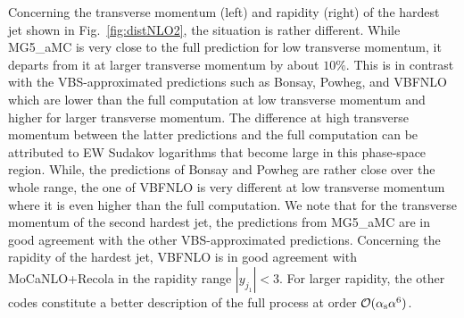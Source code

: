 \documentclass[twocolumn,epjc3]{svjour3} %
\begin{document}
    Concerning the transverse momentum (left) and rapidity (right) of the hardest jet shown in Fig.~\ref{fig:distNLO2}, the situation is rather different.
    While {\sc MG5\_aMC} is very close to the full prediction for low transverse momentum, it departs from it 
    at larger transverse momentum by about $10\%$.
    This is in contrast with the VBS-approximated predictions such as {\sc Bonsay}, {\sc Powheg}, and {\sc VBFNLO} which are lower than the full computation at low transverse momentum and higher for larger transverse momentum.
    The difference at high transverse momentum between the latter predictions and the full computation can be attributed to EW Sudakov logarithms that become large in this phase-space region.
    While, the predictions of {\sc Bonsay} and {\sc Powheg} are rather close over the whole range, the one of {\sc VBFNLO} is very different at low transverse momentum where it is even higher than the full computation.
    We note that for the transverse momentum of the second hardest jet, the predictions from {\sc MG5\_aMC} are in good agreement with the other VBS-approximated predictions.
    Concerning the rapidity of the hardest jet, {\sc VBFNLO} is in good agreement with {\sc MoCaNLO}+{\sc Recola} in the rapidity range $|y_{j_1}| < 3$.
    For larger rapidity, the other codes constitute a better description of the full process at order $\mathcal{O}(\alpha_{\rm s}\alpha^6)$.
\end{document}
